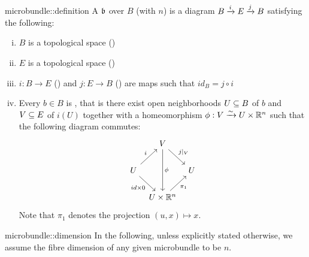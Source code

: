 \begin{mydefinition}[microbundle]{microbundle::definition}{}
    A  $\bb$ over $B$ (with  $n$)
    is a diagram $\bundle{B}{E}{i}{j}$ satisfying the following:
    \begin{enumerate}[(i)]
        \item $B$ is a topological space ()
        \item $E$ is a topological space ()
        \item $i: B \to E$ () and $j: E \to B$ ()
        are maps such that $id_B = j \circ i$
        \item Every $b \in B$ is ,
        that is there exist open neighborhoods $U \sub B$ of $b$ and $V \sub E$ of $i(U)$
        together with a homeomorphism $\phi: V \isomto U \times \R^n$ such that the following diagram commutes:
        \[
            \begin{tikzcd}[column sep=tiny]
                & V \ar[dr, "j\vert_V"] \ar[dd, "\phi"] & \\
                U \ar[ur, "i"] \ar[dr, "{id \times 0}"'] & & U \\
                & U \times\R^n \ar[ur, "\pi_1"'] &
            \end{tikzcd}
        \]
        Note that $\pi_1$ denotes the projection $(u, x) \mapsto x$.
    \end{enumerate}
\end{mydefinition}

\begin{myremark}{microbundle::dimension}{}
    In the following, unless explicitly stated otherwise,
    we assume the fibre dimension of any given microbundle to be $n$.
\end{myremark}